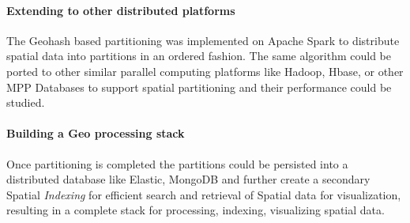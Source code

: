 \documentclass[article,type=msc,colorback,12pt,accentcolor=tud1d]{tudthesis}
\begin{document}
	   	  \paragraph{Extending to other distributed platforms}
	   	  The Geohash based partitioning was implemented on Apache Spark to distribute spatial data into partitions in an ordered fashion. The same algorithm could be ported to other similar parallel computing platforms like Hadoop, Hbase, or other MPP Databases to support spatial partitioning and their performance could be studied. 
	   	  
	   	  \paragraph{Building a Geo processing stack}
	   	   Once partitioning is completed the partitions could be persisted into a distributed database like Elastic, MongoDB and further create a secondary Spatial\textit{ Indexing} for efficient search and retrieval of Spatial data for visualization, resulting in a complete stack for processing, indexing, visualizing spatial data. 	  
   	  
   	   
  \cleardoublepage
 
 \clearpage
 
 
 	  

\clearpage
\listoftables
\end{document}
